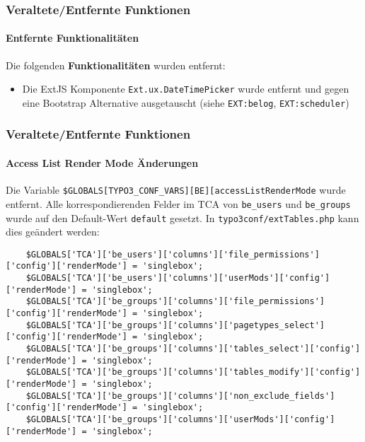 
\begin{frame}[fragile]
	\frametitle{Veraltete/Entfernte Funktionen}
	\framesubtitle{Entfernte Funktionalitäten}

	Die folgenden \textbf{Funktionalitäten} wurden entfernt:

	\begin{itemize}
		\item Die ExtJS Komponente \texttt{Ext.ux.DateTimePicker} wurde entfernt und gegen eine Bootstrap Alternative ausgetauscht (siehe \texttt{EXT:belog}, \texttt{EXT:scheduler})	
	\end{itemize}

\end{frame}


\begin{frame}[fragile]
	\frametitle{Veraltete/Entfernte Funktionen}
	\framesubtitle{Access List Render Mode Änderungen}

	Die Variable \texttt{\$GLOBALS[TYPO3\_CONF\_VARS][BE][accessListRenderMode} wurde entfernt. Alle korrespondierenden Felder im TCA von \texttt{be\_users} und \texttt{be\_groups} wurde auf den Default-Wert \texttt{default} gesetzt. In \texttt{typo3conf/extTables.php} kann dies geändert werden:

	\begin{lstlisting}
	$GLOBALS['TCA']['be_users']['columns']['file_permissions']['config']['renderMode'] = 'singlebox';
	$GLOBALS['TCA']['be_users']['columns']['userMods']['config']['renderMode'] = 'singlebox';
	$GLOBALS['TCA']['be_groups']['columns']['file_permissions']['config']['renderMode'] = 'singlebox';
	$GLOBALS['TCA']['be_groups']['columns']['pagetypes_select']['config']['renderMode'] = 'singlebox';
	$GLOBALS['TCA']['be_groups']['columns']['tables_select']['config']['renderMode'] = 'singlebox';
	$GLOBALS['TCA']['be_groups']['columns']['tables_modify']['config']['renderMode'] = 'singlebox';
	$GLOBALS['TCA']['be_groups']['columns']['non_exclude_fields']['config']['renderMode'] = 'singlebox';
	$GLOBALS['TCA']['be_groups']['columns']['userMods']['config']['renderMode'] = 'singlebox';
	\end{lstlisting}

\end{frame}

